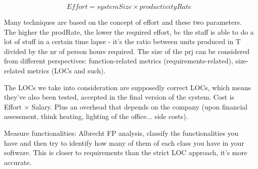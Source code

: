 \[ Effort = systemSize \times productivityRate\]

\noindent Many techniques are based on the concept of effort and these two parameters. The higher the prodRate, the lower the required effort, bc the staff is able to do a lot of stuff in a certain time lapse - it's the ratio between units produced in T divided by the nr of person hours required. The size of the prj can be considered from different perspectives: function-related metrics (requirements-related), size-related metrics (LOCs and such).

\noindent  The LOCs we take into consideration are supposedly correct LOCs, which means they've also been tested, accepted in the final version of the system. Cost is Effort $\times$ Salary. Plus an overhead that depends on the company (upon financial assessment, think heating, lighting of the office... side costs).

\noindent Measure functionalities: Albrecht FP analysis, classify the functionalities you have and then try to identify how many of them of each class you have in your software. This is closer to requirements than the strict LOC approach, it's more accurate.


